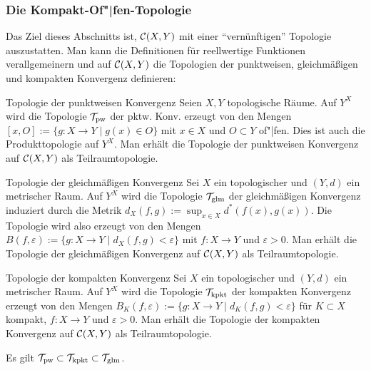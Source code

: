 \pagebreak

\subsubsection{%
    Die Kompakt-Of"|fen-Topologie%
}

\begin{Bem}
    Das Ziel dieses Abschnitts ist, $\mathcal{C}(X, Y)$ mit einer "`vernünftigen"'
    Topologie auszustatten.
    Man kann die Definitionen für reellwertige Funktionen
    verallgemeinern und auf $\mathcal{C}(X, Y)$ die Topologien der punktweisen,
    gleichmäßigen und kompakten Konvergenz definieren:
\end{Bem}

\begin{Def}{Topologie der punktweisen Konvergenz}
    Seien $X, Y$ topologische Räume.
    Auf $Y^X$ wird die Topologie $\mathcal{T}_{\text{pw}}$ der pktw. Konv. erzeugt
    von den Mengen $[x, O] := \{g\colon X \rightarrow Y \;|\; g(x) \in O\}$
    mit $x \in X$ und $O \subset Y$ of"|fen.
    Dies ist auch die Produkttopologie auf $Y^X$.
    Man erhält die Topologie der punktweisen Konvergenz auf $\mathcal{C}(X, Y)$
    als Teilraumtopologie.
\end{Def}

\begin{Def}{Topologie der gleichmäßigen Konvergenz}
    Sei $X$ ein topologischer und $(Y, d)$ ein metrischer Raum.
    Auf $Y^X$ wird die Topologie $\mathcal{T}_{\text{glm}}$ der gleichmäßigen Konvergenz
    induziert durch die Metrik
    $d_X(f, g) := \sup_{x \in X} d^\ast(f(x), g(x))$.
    Die Topologie wird also erzeugt von den Mengen
    $B(f, \varepsilon) :=
    \{g\colon X \rightarrow Y \;|\; d_X(f, g) < \varepsilon\}$
    mit $f\colon X \rightarrow Y$ und $\varepsilon > 0$.
    Man erhält die Topologie der gleichmäßigen Konvergenz auf $\mathcal{C}(X, Y)$
    als Teilraumtopologie.
\end{Def}

\begin{Def}{Topologie der kompakten Konvergenz}
    Sei $X$ ein topologischer und $(Y, d)$ ein metrischer Raum.
    Auf $Y^X$ wird die Topologie $\mathcal{T}_{\text{kpkt}}$ der kompakten Konvergenz
    erzeugt von den Mengen $B_K(f, \varepsilon) :=
    \{g\colon X \rightarrow Y \;|\; d_K(f, g) < \varepsilon\}$
    für $K \subset X$ kompakt, $f\colon X \rightarrow Y$ und $\varepsilon > 0$.
    Man erhält die Topologie der kompakten Konvergenz auf $\mathcal{C}(X, Y)$
    als Teilraumtopologie.
\end{Def}

\begin{Bem}
    Es gilt $\mathcal{T}_{\text{pw}} \subset \mathcal{T}_{\text{kpkt}} \subset \mathcal{T}_{\text{glm}}$.
\end{Bem}

